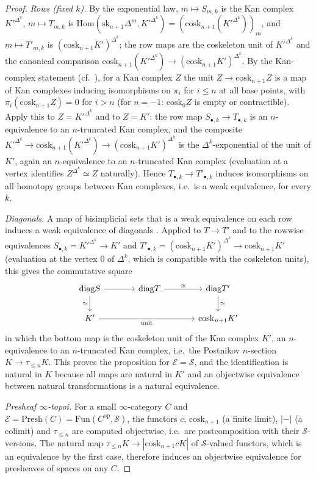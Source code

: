 \documentclass[11pt]{amsart}
\theoremstyle{definition}
\newcommand{\Presh}{\mathrm{Presh}}
\newcommand{\Hom}{\mathrm{Hom}}
\newcommand{\cosk}{\mathrm{cosk}}
\newcommand{\sk}{\mathrm{sk}}
\newcommand{\Fun}{\mathrm{Fun}}
\newcommand{\sS}{\mathcal S}
\newcommand{\E}{\mathcal E}
\newcommand{\tr}[1]{\tau_{\le #1}}
\newcommand{\re}{|{-}|}
\newcommand{\diag}{\mathrm{diag}}
\begin{document}
\begin{proof}
\emph{Rows (fixed $k$).} By the exponential law,
$m\mapsto S_{m,k}$ is the Kan complex $K'^{\Delta^k}$, $m\mapsto T_{m,k}$ is
$\Hom(\sk_{n+1}\Delta^m,K'^{\Delta^k})=(\cosk_{n+1}(K'^{\Delta^k}))_m$, and
$m\mapsto T'_{m,k}$ is $(\cosk_{n+1}K')^{\Delta^k}$; the row maps are the
coskeleton unit of $K'^{\Delta^k}$ and the canonical comparison
$\cosk_{n+1}(K'^{\Delta^k})\to(\cosk_{n+1}K')^{\Delta^k}$. By the Kan-complex
statement \cite[Lemma~7.1]{Postnikov} (cf.\ \cite{Duskin}), for a Kan complex
$Z$ the unit $Z\to\cosk_{n+1}Z$ is a map of Kan complexes inducing
isomorphisms on $\pi_i$ for $i\le n$ at all base points, with
$\pi_i(\cosk_{n+1}Z)=0$ for $i>n$ (for $n=-1$: $\cosk_0Z$ is empty or
contractible). Apply this to $Z=K'^{\Delta^k}$ and to $Z=K'$: the row map
$S_{\bullet,k}\to T_{\bullet,k}$ is an $n$-equivalence to an $n$-truncated Kan
complex, and the composite $K'^{\Delta^k}\to\cosk_{n+1}(K'^{\Delta^k})\to
(\cosk_{n+1}K')^{\Delta^k}$ is the $\Delta^k$-exponential of the unit of $K'$,
again an $n$-equivalence to an $n$-truncated Kan complex (evaluation at a
vertex identifies $Z^{\Delta^k}\simeq Z$ naturally). Hence
$T_{\bullet,k}\to T'_{\bullet,k}$ induces isomorphisms on all homotopy groups
between Kan complexes, i.e.\ is a weak equivalence, for every $k$.

\emph{Diagonals.} A map of bisimplicial sets that is a weak equivalence on
each row induces a weak equivalence of diagonals \cite[IV.1.7]{GJ}. Applied
to $T\to T'$ and to the rowwise equivalences $S_{\bullet,k}=K'^{\Delta^k}\to K'$
and $T'_{\bullet,k}=(\cosk_{n+1}K')^{\Delta^k}\to\cosk_{n+1}K'$ (evaluation at
the vertex $0$ of $\Delta^k$, which is compatible with the coskeleton units),
this gives the commutative square
\[
\begin{tikzcd}[column sep=large]
\diag S\arrow[r]\arrow[d,"\simeq"'] & \diag T\arrow[r,"\simeq"] & \diag T'\arrow[d,"\simeq"]\\
K'\arrow[rr,"\text{unit}"'] & & \cosk_{n+1}K'
\end{tikzcd}
\]
in which the bottom map is the coskeleton unit of the Kan complex $K'$, an
$n$-equivalence to an $n$-truncated Kan complex, i.e.\ the Postnikov
$n$-section $K\to\tr nK$. This proves the proposition for $\E=\sS$, and the
identification is natural in $K$ because all maps are natural in $K'$ and
an objectwise equivalence between natural transformations is a natural
equivalence.

\emph{Presheaf $\infty$-topoi.} For a small $\infty$-category $C$ and
$\E=\Presh(C)=\Fun(C^{\mathrm{op}},\sS)$, the functors $c$, $\cosk_{n+1}$ (a
finite limit), $\re$ (a colimit) and $\tr n$ are computed objectwise, i.e.\
are postcomposition with their $\sS$-versions. The natural map
$\tr nK\to|\cosk_{n+1}cK|$ of $\sS$-valued functors, which is an equivalence by
the first case, therefore induces an objectwise equivalence for presheaves of
spaces on any $C$.


\end{proof}
\end{document}
